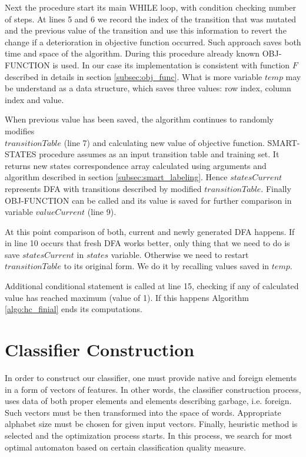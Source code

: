 \documentclass{mini}
\begin{document}
Next the procedure start its main \textsc{WHILE} loop, with condition checking number of steps. At lines 5 and 6 we record the index of the transition that was mutated and the previous value of the transition and use this information to revert the change if a deterioration in objective function occurred. Such approach saves both time and space of the algorithm. During this procedure already known \textsc{OBJ-FUNCTION} is used. In our case its implementation is consistent with function $F$ described in details in section \ref{subsec:obj_func}. What is more variable $temp$ may be understand as a data structure, which saves three values: row index, column index and value.

When previous value has been saved, the algorithm continues to randomly modifies \\ $transitionTable$ (line 7) and calculating new value of objective function. \textsc{SMART-STATES} procedure assumes as an input transition table and training set. It returns new states correspondence array calculated using arguments and algorithm described in section \ref{subsec:smart_labeling}. Hence $statesCurrent$ represents DFA with transitions described by modified $transitionTable$. Finally \textsc{OBJ-FUNCTION} can be called and its value is saved for further comparison in variable $valueCurrent$ (line 9).

At this point comparison of both, current and newly generated DFA happens. If in line 10 occurs that fresh DFA works better, only thing that we need to do is save $statesCurrent$ in $states$ variable. Otherwise we need to restart $transitionTable$ to its original form. We do it by recalling values saved in $temp$.

Additional conditional statement is called at line 15, checking if any of calculated value has reached maximum (value of 1). If this happens Algorithm \ref{algo:hc_finial} ends its computations.

\chapter{Classifier Construction}\label{chap:classifier}

In order to construct our classifier, one must provide native and foreign elements in a form of vectors of features. In other words, the classifier construction process, uses data of both proper elements and elements describing garbage, i.e. foreign. Such vectors must be then transformed into the space of words. Appropriate alphabet size must be chosen for given input vectors. Finally, heuristic method is selected and the optimization process starts. In this process, we search for most optimal automaton based on certain classification quality measure.
\end{document}
